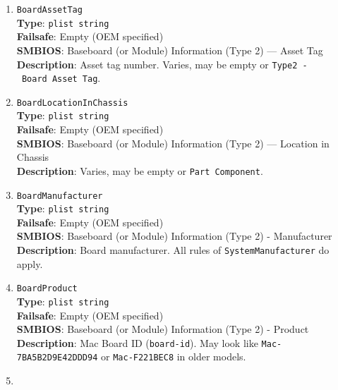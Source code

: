 \documentclass[]{article}
\begin{document}
\begin{enumerate}
\begin{verbatim}
Apple ROM Version
 BIOS ID:      MBP151.88Z.F000.B00.1811142212
 Model:        MBP151
 EFI Version:  220.230.16.0.0
 Built by:     root@quinoa
 Date:         Wed Nov 14 22:12:53 2018
 Revision:     220.230.16 (B&I)
 ROM Version:  F000_B00
 Build Type:   Official Build, RELEASE
 Compiler:     Apple LLVM version 10.0.0 (clang-1000.2.42)
 UUID:         E5D1475B-29FF-32BA-8552-682622BA42E1
 UUID:         151B0907-10F9-3271-87CD-4BF5DBECACF5
\end{verbatim}
\item
  \texttt{BoardAssetTag}\\
  \textbf{Type}: \texttt{plist\ string}\\
  \textbf{Failsafe}: Empty (OEM specified)\\
  \textbf{SMBIOS}: Baseboard (or Module) Information (Type 2) --- Asset
  Tag\\
  \textbf{Description}: Asset tag number. Varies, may be empty or
  \texttt{Type2\ -\ Board\ Asset\ Tag}.
\item
  \texttt{BoardLocationInChassis}\\
  \textbf{Type}: \texttt{plist\ string}\\
  \textbf{Failsafe}: Empty (OEM specified)\\
  \textbf{SMBIOS}: Baseboard (or Module) Information (Type 2) --- Location
  in Chassis\\
  \textbf{Description}: Varies, may be empty or
  \texttt{Part\ Component}.
\item
  \texttt{BoardManufacturer}\\
  \textbf{Type}: \texttt{plist\ string}\\
  \textbf{Failsafe}: Empty (OEM specified)\\
  \textbf{SMBIOS}: Baseboard (or Module) Information (Type 2) -
  Manufacturer\\
  \textbf{Description}: Board manufacturer. All rules of
  \texttt{SystemManufacturer} do apply.
\item
  \texttt{BoardProduct}\\
  \textbf{Type}: \texttt{plist\ string}\\
  \textbf{Failsafe}: Empty (OEM specified)\\
  \textbf{SMBIOS}: Baseboard (or Module) Information (Type 2) -
  Product\\
  \textbf{Description}: Mac Board ID (\texttt{board-id}). May look like
  \texttt{Mac-7BA5B2D9E42DDD94} or \texttt{Mac-F221BEC8} in older
  models.
\item

\end{enumerate}
\end{document}
